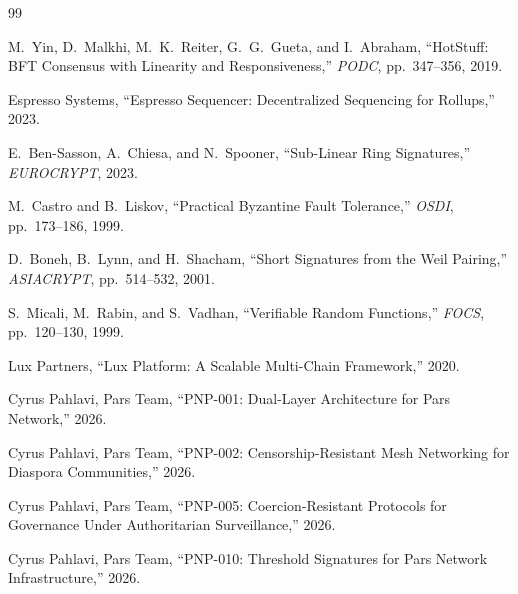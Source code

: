 \documentclass[11pt,a4paper]{article}
\begin{document}
\begin{thebibliography}{99}

M.~Yin, D.~Malkhi, M.~K.~Reiter, G.~G.~Gueta, and I.~Abraham,
``HotStuff: BFT Consensus with Linearity and Responsiveness,''
\emph{PODC}, pp.~347--356, 2019.

Espresso Systems,
``Espresso Sequencer: Decentralized Sequencing for Rollups,''
2023.

E.~Ben-Sasson, A.~Chiesa, and N.~Spooner,
``Sub-Linear Ring Signatures,''
\emph{EUROCRYPT}, 2023.

M.~Castro and B.~Liskov,
``Practical Byzantine Fault Tolerance,''
\emph{OSDI}, pp.~173--186, 1999.

D.~Boneh, B.~Lynn, and H.~Shacham,
``Short Signatures from the Weil Pairing,''
\emph{ASIACRYPT}, pp.~514--532, 2001.

S.~Micali, M.~Rabin, and S.~Vadhan,
``Verifiable Random Functions,''
\emph{FOCS}, pp.~120--130, 1999.

Lux Partners,
``Lux Platform: A Scalable Multi-Chain Framework,''
2020.

Cyrus Pahlavi, Pars Team,
``PNP-001: Dual-Layer Architecture for Pars Network,''
2026.

Cyrus Pahlavi, Pars Team,
``PNP-002: Censorship-Resistant Mesh Networking for Diaspora Communities,''
2026.

Cyrus Pahlavi, Pars Team,
``PNP-005: Coercion-Resistant Protocols for Governance Under
Authoritarian Surveillance,''
2026.

Cyrus Pahlavi, Pars Team,
``PNP-010: Threshold Signatures for Pars Network Infrastructure,''
2026.

\end{thebibliography}
\end{document}
